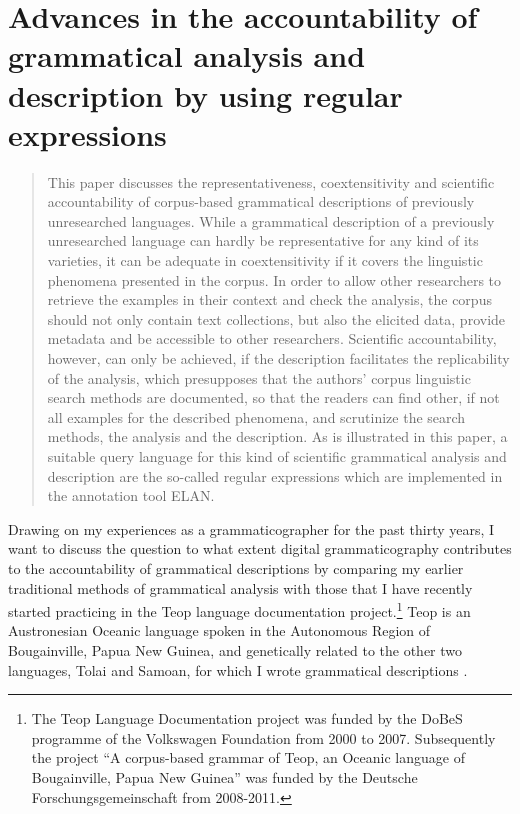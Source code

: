 
\renewcommand\chapname{Grammatical analysis and description and regexes}	
\renewcommand\longchapname{Advances in the accountability of grammatical analysis and description by using regular expressions}
\renewcommand\shortauthor{Ulrike Mosel}
\renewcommand\longauthor{Ulrike Mosel\\ University of Kiel}
\chapter*{\longchapname}
\chapterauthor{\longauthor}
\mytoc{} 

\begin{abstract}
 This paper discusses the representativeness, coextensitivity and scientific accountability of corpus-based grammatical descriptions of previously unresearched languages. While a grammatical description of a previously unresearched language can hardly be representative for any kind of its varieties, it can be adequate in coextensitivity if it covers the linguistic phenomena presented in the corpus. In order to allow other researchers to retrieve the examples in their context and check the analysis, the corpus should not only contain text collections, but also the elicited data, provide metadata and be accessible to other researchers. Scientific accountability, however, can only be achieved, if the description facilitates the replicability of the analysis, which presupposes that the authors’ corpus linguistic search methods are documented, so that the readers can find other, if not all examples for the described phenomena, and scrutinize the search methods, the analysis and the description. As is illustrated in this paper, a suitable query language for this kind of scientific grammatical analysis and description are the so-called regular expressions which are implemented in the annotation tool ELAN.
\end{abstract}


Drawing on my experiences as a grammaticographer for the past thirty years, I want to discuss the question to what extent digital grammaticography contributes to the accountability of grammatical descriptions by comparing my earlier traditional methods of grammatical analysis with those that I have recently started practicing in the Teop language documentation project.\footnote{The 
 Teop Language Documentation project was funded by the DoBeS programme of the Volkswagen Foundation from 2000 to 2007. Subsequently the project  ``A corpus-based grammar of Teop, an Oceanic language of Bougainville, Papua New Guinea'' was funded by the Deutsche Forschungsgemeinschaft from 2008-2011. 
}
 Teop is an Austronesian Oceanic language spoken in the Autonomous Region of Bougainville, Papua New Guinea, and genetically related to the other two languages, Tolai and Samoan, for which I wrote grammatical descriptions \citep{Mosel1984,MoselEtAl1992}. 


